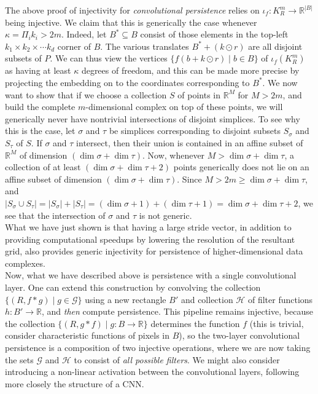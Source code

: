 \documentclass[12pt]{amsart}
\numberwithin{figure}{section}
\begin{document}
The above proof of injectivity for \emph{convolutional persistence} relies on $\iota_{f}:K_{R}^{m} \to \mathbb{R}^{|B|}$ being injective. We claim that this is generically the case whenever $\kappa = \Pi_{i}k_i > 2m$. Indeed, let $B^{*} \subseteq B$ consist of those elements in the top-left $k_1 \times k_2 \times \cdots k_d$ corner of $B$. The various translates $B^{*} + (k \odot r)$ are all disjoint subsets of $P$. We can thus view the vertices $\{f(b + k \odot r) \mid b \in B\}$ of $\iota_{f}(K_{R}^m)$ as having at least $\kappa$ degrees of freedom, and this can be made more precise by projecting the embedding on to the coordinates corresponding to $B^*$. We now want to show that if we choose a collection $S$ of points in $\mathbb{R}^{M}$ for $M > 2m$, and build the complete $m$-dimensional complex on top of these points, we will generically never have nontrivial intersections of disjoint simplices. To see why this is the case, let $\sigma$ and $\tau$ be simplices corresponding to disjoint subsets $S_{\sigma}$ and $S_{\tau}$ of $S$. If $\sigma$ and $\tau$ intersect, then their union is contained in an affine subset of $\mathbb{R}^M$ of dimension $(\dim \sigma + \dim \tau)$. Now, whenever $M > \dim \sigma + \dim \tau$, a collection of at least $(\dim \sigma + \dim \tau + 2)$ points generically does not lie on an affine subset of dimension $(\dim \sigma + \dim \tau)$. Since $M > 2m \geq \dim \sigma + \dim \tau$, and $|S_{\sigma} \cup S_{\tau}| = |S_{\sigma}| + |S_{\tau}| = (\dim \sigma + 1) + (\dim \tau + 1) = \dim \sigma + \dim \tau + 2$, we see that the intersection of $\sigma$ and $\tau$ is not generic.\\

What we have just shown is that having a large stride vector, in addition to providing computational speedups by lowering the resolution of the resultant grid, also provides generic injectivity for persistence of higher-dimensional data complexes.\\ 

Now, what we have described above is persistence with a single convolutional layer. One can extend this construction by convolving the collection $\{(R, f \ast g) \mid g \in \mathcal{G}\}$ using a new rectangle $B'$ and collection $\mathcal{H}$ of filter functions $h: B' \to \mathbb{R}$, and \emph{then} compute persistence. This pipeline remains injective, because the collection $\{(R, g \ast f) \mid g: B \to \mathbb{R}\}$ determines the function $f$ (this is trivial, consider characteristic functions of pixels in $B$), so the two-layer convolutional persistence is a composition of two injective operations, where we are now taking the sets $\mathcal{G}$ and $\mathcal{H}$ to consist of \emph{all possible filters}. We might also consider introducing a non-linear activation between the convolutional layers, following more closely the structure of a CNN.\\
\end{document}
